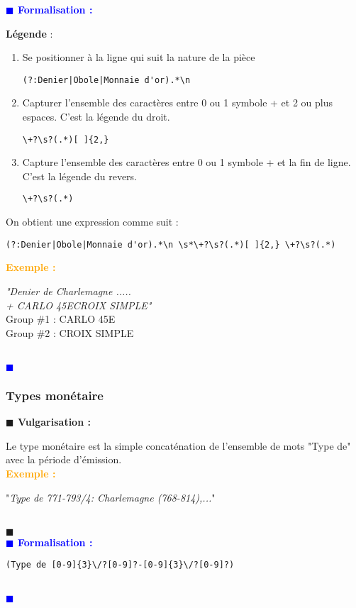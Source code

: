\documentclass[a4paper, 11pt]{article}
\newenvironment{vulgarisation}
    {
    \textbf{\textcolor{dark-blue}{$\blacksquare$  Vulgarisation : \\}}

    }
    {
    ~\\\textcolor{dark-blue}{$\blacksquare$}\\
    }
\newenvironment{formalisation}
    {
    \textbf{\textcolor{blue}{$\blacksquare$  Formalisation : \\}}
    }
    {
    ~\\\textcolor{blue}{$\blacksquare$}\\
    }
\newenvironment{exemple}
    {
    \textbf{\textcolor{orange}{
    Exemple : \\}}
    }
    {\\
    }
\begin{document}
\begin{formalisation}
\textbf{Légende} :
\begin{enumerate}
\item Se positionner à la ligne qui suit la nature de la pièce
\begin{verbatim}
(?:Denier|Obole|Monnaie d'or).*\n
\end{verbatim}
\item Capturer l'ensemble des caractères entre 0 ou 1 symbole + et 2 ou plus espaces. C'est la légende du droit.
\begin{verbatim}
\+?\s?(.*)[ ]{2,}
\end{verbatim}
\item Capture l'ensemble des caractères entre 0 ou 1 symbole + et la fin de ligne. C'est la légende du revers.
\begin{verbatim}
\+?\s?(.*)
\end{verbatim}
\end{enumerate}

On obtient une expression comme suit : 
\begin{verbatim}
(?:Denier|Obole|Monnaie d'or).*\n \s*\+?\s?(.*)[ ]{2,} \+?\s?(.*)
\end{verbatim}

\begin{exemple}
\emph{"Denier de Charlemagne ..... \\+ CARLO  45E\indent\indent CROIX SIMPLE"}\\
Group \#1 : CARLO  45E \\
Group \#2 : CROIX SIMPLE
\end{exemple}
\end{formalisation}

\subsubsection{Types monétaire}
\begin{vulgarisation}
Le type monétaire est la simple concaténation de l'ensemble de mots "Type de" avec la période d'émission.\\
\begin{exemple}
"\emph{Type de 771-793/4: Charlemagne (768-814),...}"
\end{exemple}
\end{vulgarisation}
\begin{formalisation}
\begin{verbatim}
(Type de [0-9]{3}\/?[0-9]?-[0-9]{3}\/?[0-9]?)
\end{verbatim}
\end{formalisation}
\end{document}
